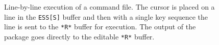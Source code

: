 \documentclass{article}
\newcommand{\stexttt}[1]{{\small\texttt{#1}}}
\begin{document}
\begin{figure}[tb]
  \caption{Line-by-line execution of a command file. The cursor is
    placed on a line in the \stexttt{ESS[S]} buffer and then with a single
    key sequence
    the line is sent to the \stexttt{*R*} buffer for
    execution.  The output of the package goes directly to the
    editable \stexttt{*R*} buffer.}
  \label{f.ess-demo}
\end{figure}
\end{document}
